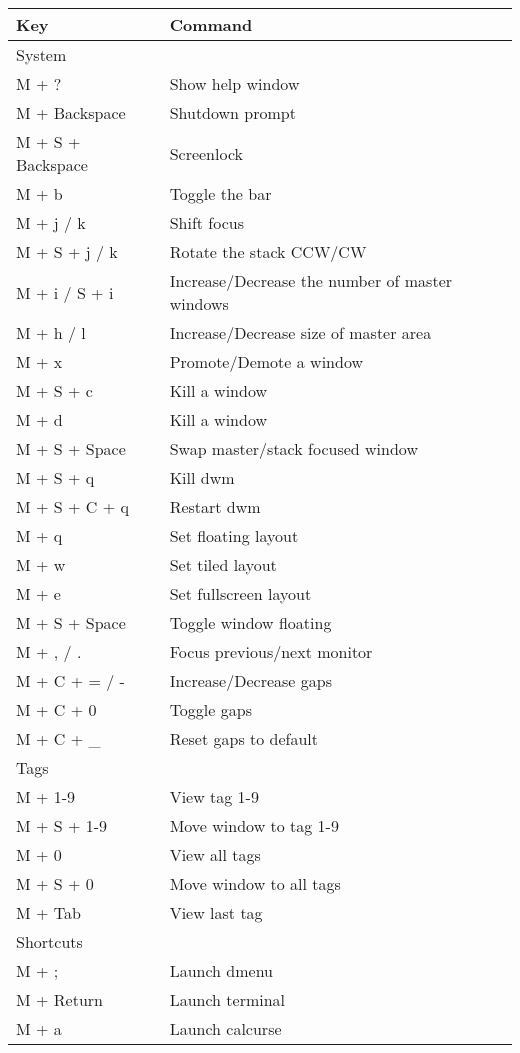 \documentclass{article}
\begin{document}
\begin{center}
	\begin{tabular}{|l|l|}
		\hline
		Key & Command\\
		\hline
		System&\\
		\hline
		M + ? & Show help window\\
		M + Backspace & Shutdown prompt\\
		M + S + Backspace & Screenlock\\
		M + b & Toggle the bar\\
		M + j / k & Shift focus\\
		M + S + j / k & Rotate the stack CCW/CW\\
		M + i / S + i & Increase/Decrease the number of master windows\\
		M + h / l & Increase/Decrease size of master area\\
		M + x & Promote/Demote a window\\
		M + S + c & Kill a window\\
		M + d & Kill a window\\
		M + S + Space & Swap master/stack focused window\\
		M + S + q & Kill dwm\\
		M + S + C + q & Restart dwm\\
		M + q & Set floating layout\\
		M + w & Set tiled layout\\
		M + e & Set fullscreen layout\\
		M + S + Space & Toggle window floating\\
		M + , / . & Focus previous/next monitor\\
		M + C + = / - & Increase/Decrease gaps\\
		M + C + 0 & Toggle gaps\\
		M + C + \_ & Reset gaps to default\\
		\hline
		Tags&\\
		\hline
		M + 1-9 & View tag 1-9\\
		M + S + 1-9 & Move window to tag 1-9\\
		M + 0 & View all tags\\
		M + S + 0 & Move window to all tags\\
		M + Tab & View last tag\\
		\hline
		Shortcuts&\\
		\hline
		M + ; & Launch dmenu\\
		M + Return & Launch terminal\\
		M + a & Launch calcurse\\

\end{tabular}
\end{center}
\end{document}
